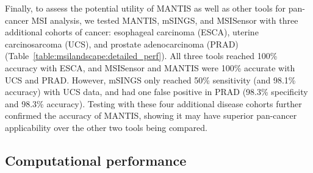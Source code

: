 Finally, to assess the potential utility of MANTIS as well as other tools for pan-cancer MSI analysis, we tested MANTIS, mSINGS, and MSISensor with three additional cohorts of cancer: esophageal carcinoma (ESCA), uterine carcinosarcoma (UCS), and prostate adenocarcinoma (PRAD) (Table~\ref{table:msilandscape:detailed_perf}). All three tools reached 100\% accuracy with ESCA, and MSISensor and MANTIS were 100\% accurate with UCS and PRAD\@. However, mSINGS only reached 50\% sensitivity (and 98.1\% accuracy) with UCS data, and had one false positive in PRAD (98.3\% specificity and 98.3\% accuracy). Testing with these four additional disease cohorts further confirmed the accuracy of MANTIS, showing it may have superior pan-cancer applicability over the other two tools being compared.

\subsection{Computational performance}
